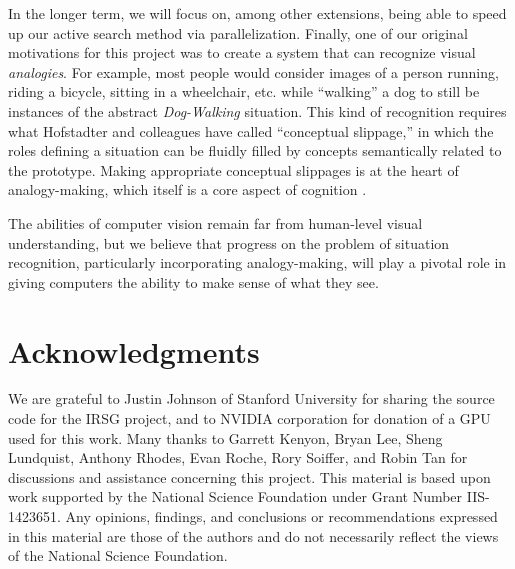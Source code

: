 \documentclass[conference]{IEEEtran}
\begin{document}
In the longer term, we will focus on, among other extensions, being
able to speed up our active search method via parallelization.
Finally, one of our original motivations for this project was to
create a system that can recognize visual {\it analogies}.  For
example, most people would consider images of a person running, riding a bicycle, sitting in a wheelchair, etc. while ``walking'' a dog to still be instances
of the abstract {\it Dog-Walking} situation.  This kind of recognition
requires what Hofstadter and colleagues have called ``conceptual
slippage,'' in which the roles defining a situation can be fluidly
filled by concepts semantically related to the prototype. Making
appropriate conceptual slippages is at the heart of analogy-making,
which itself is a core aspect of cognition \cite{Hofstadter1994}.

The abilities of computer vision remain far from human-level visual
understanding, but we believe that progress on the problem of
situation recognition, particularly incorporating analogy-making, will
play a pivotal role in giving computers the ability to make sense of
what they see.


\section*{Acknowledgments}
We are grateful to Justin Johnson of Stanford University for sharing
the source code for the IRSG project, and to NVIDIA corporation for
donation of a GPU used for this work.  Many thanks to Garrett Kenyon,
Bryan Lee, Sheng Lundquist, Anthony Rhodes, Evan Roche, Rory Soiffer,
and Robin Tan for discussions and assistance concerning this
project. This material is based upon work supported by the National
Science Foundation under Grant Number IIS-1423651.  Any opinions,
findings, and conclusions or recommendations expressed in this
material are those of the authors and do not necessarily reflect the
views of the National Science Foundation.



\end{document}
